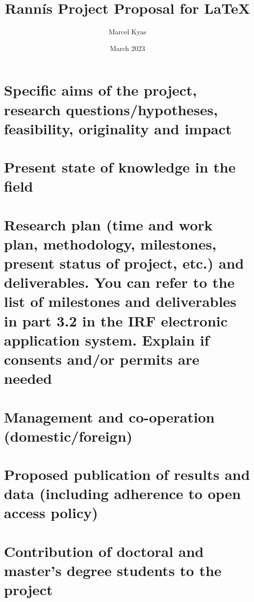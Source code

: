 \documentclass[final]{rannisproposal}
\title{Rannís Project Proposal for LaTeX}
\author{Marcel Kyas}
\date{March 2023}
\begin{document}
\maketitle




\section{Specific aims of the project, research questions/hypotheses, feasibility, originality and impact}

\section{Present state of knowledge in the field}

\section{Research plan (time and work plan, methodology, milestones, present status of project, etc.) and deliverables. You can refer to the list of milestones and deliverables in part 3.2 in the IRF electronic application system. Explain if consents and/or permits are needed}

\section{Management and co-operation (domestic/foreign)}

\section{Proposed publication of results and data (including adherence to open access policy)}
\label{sec:prop-publ-results}

\section{Contribution of doctoral and master’s degree students to the project}

\clearpage
\printbibliography
\end{document}
